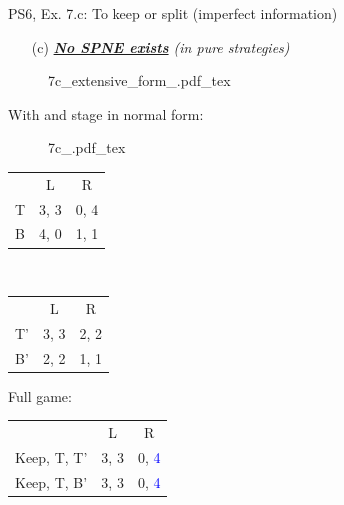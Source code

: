 \begin{frame}{PS6, Ex. 7.c: To keep or split (imperfect information)}
    \begin{itemize}
      \item[(c)] \textit{\textbf{\underline{No SPNE exists}} (in pure strategies)}
    \end{itemize}
    \vspace{-16pt}
    \begin{figure}[!h]
      \center
      \def\svgwidth{.8\columnwidth}
      {7c_extensive_form_.pdf_tex}
    \end{figure}
    \vspace{-8pt}
    \begin{multicols}{2}
      With  and  stage in normal form:
      \vspace{-4pt}
      \begin{figure}[!h]
        \center
        \def\svgwidth{.5\columnwidth}
        {7c_.pdf_tex}
      \end{figure}
      \vspace{-9pt}
      \begin{table}
        \begin{tabular}{l|c|c|}
          \multicolumn{1}{c}{} & \multicolumn{1}{c}{L} & \multicolumn{1}{c}{R} \\\cline{2-3}
          T & 3, 3 & 0, 4 \\\cline{2-3}
          B & 4, 0 & 1, 1 \\\cline{2-3}
        \end{tabular}\
        \begin{tabular}{l|c|c|}
          \multicolumn{1}{c}{} & \multicolumn{1}{c}{L} & \multicolumn{1}{c}{R} \\\cline{2-3}
          T' & 3, 3 & 2, 2 \\\cline{2-3}
          B' & 2, 2 & 1, 1 \\\cline{2-3}
        \end{tabular}
      \end{table}
    \vfill\null \columnbreak
    Full game:
    \vspace{-16pt}
    \begin{table}
      \begin{tabular}{l|c|c|}
        \multicolumn{1}{c}{} & \multicolumn{1}{c}{L} & \multicolumn{1}{c}{R} \\\cline{2-3}
        Keep, T, T' & 3, 3 & 0, \textcolor{blue}{4} \\\cline{2-3}
        Keep, T, B' & 3, 3 & 0, \textcolor{blue}{4} \\\cline{2-3}

\end{tabular}
\end{table}
\end{multicols}
\end{frame}

